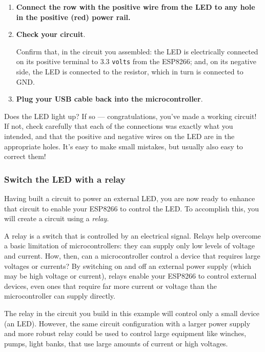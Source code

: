 \begin{enumerate}
	\item \textbf{Connect the row with the positive wire from the LED to any hole in the positive (red) power rail.}

	\item \textbf{Check your circuit}.

	Confirm that, in the circuit you assembled: the LED is electrically connected on its positive terminal to 3.3 \texttt{volts} from the ESP8266; and, on its negative side, the LED is connected to the resistor, which in turn is connected to GND.

	\item \textbf{Plug your USB cable back into the microcontroller}.
\end{enumerate}
Does the LED light up? If so --- congratulations, you’ve made a working circuit!
If not, check carefully that each of the connections was exactly what you intended, and that the positive and negative wires on the LED are in the appropriate holes.
It’s easy to make small mistakes, but usually also easy to correct them!


\subsubsection{\howto Switch the LED with a relay}

Having built a circuit to power an external LED, you are now ready to enhance that circuit to enable your ESP8266 to control the LED.
To accomplish this, you will create a circuit using a \emph{relay}.

A relay is a switch that is controlled by an electrical signal.
Relays help overcome a basic limitation of microcontrollers: they can supply only low levels of voltage and current.
How, then, can a microcontroller control a device that requires large voltages or currents?
By switching on and off an external power supply (which may be high voltage or current), relays enable your ESP8266 to control external devices, even ones that require far more current or voltage than the microcontroller can supply directly.

The relay in the circuit you build in this example will control only a small device (an LED).
However, the same circuit configuration with a larger power supply and more robust relay could be used to control large equipment like winches, pumps, light banks, \etc that use large amounts of current or high voltages.


